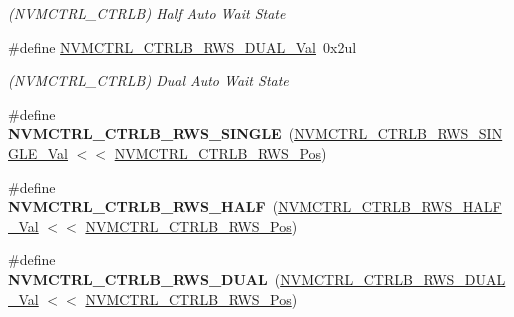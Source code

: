 \begin{DoxyCompactItemize}
\begin{DoxyCompactList}\small\item\em (N\+V\+M\+C\+T\+R\+L\+\_\+\+C\+T\+R\+L\+B) Half Auto Wait State \end{DoxyCompactList}\item 
\hypertarget{group___s_a_m_l21___n_v_m_c_t_r_l_ga757070851f4e48ecc24b2d75da0aa6e2}{}\#define \hyperlink{group___s_a_m_l21___n_v_m_c_t_r_l_ga757070851f4e48ecc24b2d75da0aa6e2}{N\+V\+M\+C\+T\+R\+L\+\_\+\+C\+T\+R\+L\+B\+\_\+\+R\+W\+S\+\_\+\+D\+U\+A\+L\+\_\+\+Val}~0x2ul\label{group___s_a_m_l21___n_v_m_c_t_r_l_ga757070851f4e48ecc24b2d75da0aa6e2}

\begin{DoxyCompactList}\small\item\em (N\+V\+M\+C\+T\+R\+L\+\_\+\+C\+T\+R\+L\+B) Dual Auto Wait State \end{DoxyCompactList}\item 
\hypertarget{group___s_a_m_l21___n_v_m_c_t_r_l_ga3011ea9db7c53bb00f357712c1d7d4b2}{}\#define {\bfseries N\+V\+M\+C\+T\+R\+L\+\_\+\+C\+T\+R\+L\+B\+\_\+\+R\+W\+S\+\_\+\+S\+I\+N\+G\+L\+E}~(\hyperlink{group___s_a_m_l21___n_v_m_c_t_r_l_ga38b52d3de7998f872c54a599e4e21f25}{N\+V\+M\+C\+T\+R\+L\+\_\+\+C\+T\+R\+L\+B\+\_\+\+R\+W\+S\+\_\+\+S\+I\+N\+G\+L\+E\+\_\+\+Val}  $<$$<$ \hyperlink{group___s_a_m_l21___n_v_m_c_t_r_l_ga43e4b7eb29abd297bee59f003d715e26}{N\+V\+M\+C\+T\+R\+L\+\_\+\+C\+T\+R\+L\+B\+\_\+\+R\+W\+S\+\_\+\+Pos})\label{group___s_a_m_l21___n_v_m_c_t_r_l_ga3011ea9db7c53bb00f357712c1d7d4b2}

\item 
\hypertarget{group___s_a_m_l21___n_v_m_c_t_r_l_ga49c5e1bdebf752025bc9874c096865e4}{}\#define {\bfseries N\+V\+M\+C\+T\+R\+L\+\_\+\+C\+T\+R\+L\+B\+\_\+\+R\+W\+S\+\_\+\+H\+A\+L\+F}~(\hyperlink{group___s_a_m_l21___n_v_m_c_t_r_l_gaaf0413ccbb9e3c4ebfe2c2f8f2a10da6}{N\+V\+M\+C\+T\+R\+L\+\_\+\+C\+T\+R\+L\+B\+\_\+\+R\+W\+S\+\_\+\+H\+A\+L\+F\+\_\+\+Val}    $<$$<$ \hyperlink{group___s_a_m_l21___n_v_m_c_t_r_l_ga43e4b7eb29abd297bee59f003d715e26}{N\+V\+M\+C\+T\+R\+L\+\_\+\+C\+T\+R\+L\+B\+\_\+\+R\+W\+S\+\_\+\+Pos})\label{group___s_a_m_l21___n_v_m_c_t_r_l_ga49c5e1bdebf752025bc9874c096865e4}

\item 
\hypertarget{group___s_a_m_l21___n_v_m_c_t_r_l_ga5b895ffd7c3df025c5accf229c03512e}{}\#define {\bfseries N\+V\+M\+C\+T\+R\+L\+\_\+\+C\+T\+R\+L\+B\+\_\+\+R\+W\+S\+\_\+\+D\+U\+A\+L}~(\hyperlink{group___s_a_m_l21___n_v_m_c_t_r_l_ga757070851f4e48ecc24b2d75da0aa6e2}{N\+V\+M\+C\+T\+R\+L\+\_\+\+C\+T\+R\+L\+B\+\_\+\+R\+W\+S\+\_\+\+D\+U\+A\+L\+\_\+\+Val}    $<$$<$ \hyperlink{group___s_a_m_l21___n_v_m_c_t_r_l_ga43e4b7eb29abd297bee59f003d715e26}{N\+V\+M\+C\+T\+R\+L\+\_\+\+C\+T\+R\+L\+B\+\_\+\+R\+W\+S\+\_\+\+Pos})\label{group___s_a_m_l21___n_v_m_c_t_r_l_ga5b895ffd7c3df025c5accf229c03512e}


\end{DoxyCompactItemize}
